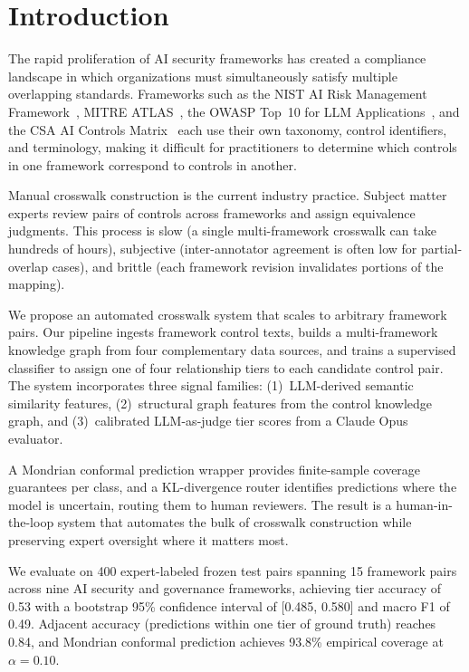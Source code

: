 \section{Introduction}
\label{sec:intro}

The rapid proliferation of AI security frameworks has created a
compliance landscape in which organizations must simultaneously satisfy
multiple overlapping standards. Frameworks such as the NIST AI Risk
Management Framework~\citep{nist_ai_rmf}, MITRE
ATLAS~\citep{mitre_atlas}, the OWASP Top~10 for LLM
Applications~\citep{owasp_llm_top10}, and the CSA AI Controls
Matrix~\citep{csa_aicm} each use their own taxonomy, control
identifiers, and terminology, making it difficult for practitioners to
determine which controls in one framework correspond to controls in
another.

Manual crosswalk construction is the current industry practice. Subject
matter experts review pairs of controls across frameworks and assign
equivalence judgments. This process is slow (a single multi-framework
crosswalk can take hundreds of hours), subjective (inter-annotator
agreement is often low for partial-overlap cases), and brittle (each
framework revision invalidates portions of the mapping).

We propose an automated crosswalk system that scales to arbitrary
framework pairs. Our pipeline ingests framework control texts, builds a
multi-framework knowledge graph from four complementary data sources,
and trains a supervised classifier to assign one of four relationship
tiers to each candidate control pair. The system incorporates three
signal families: (1)~LLM-derived semantic similarity features,
(2)~structural graph features from the control knowledge graph, and
(3)~calibrated LLM-as-judge tier scores from a Claude Opus evaluator.

A Mondrian conformal prediction wrapper provides finite-sample coverage
guarantees per class, and a KL-divergence router identifies predictions
where the model is uncertain, routing them to human reviewers. The
result is a human-in-the-loop system that automates the bulk of
crosswalk construction while preserving expert oversight where it
matters most.

We evaluate on 400 expert-labeled frozen test pairs spanning 15
framework pairs across nine AI security and governance frameworks,
achieving tier accuracy of 0.53 with a bootstrap 95\% confidence
interval of [0.485, 0.580] and macro F1 of 0.49. Adjacent accuracy
(predictions within one tier of ground truth) reaches 0.84, and
Mondrian conformal prediction achieves 93.8\% empirical coverage at
$\alpha = 0.10$.

